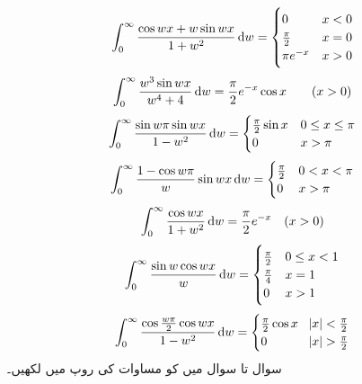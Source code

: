 \begin{align*}
\int_0^{\infty} \frac{\cos wx+w\sin wx}{1+w^2}\dif w=
\begin{cases}
0&x<0\\
\frac{\pi}{2}&x=0\\
\pi e^{-x} &x>0
\end{cases}
\end{align*}
\begin{align*}
\int_0^{\infty} \frac{w^3\sin wx}{w^4+4}\dif w=\frac{\pi}{2}e^{-x}\cos x\quad \quad (x>0)
\end{align*}
\begin{align*}
\int_0^{\infty} \frac{\sin w\pi\sin wx}{1-w^2}\dif w=
\begin{cases}
\frac{\pi}{2}\sin x&0\le x\le \pi\\
0&x>\pi
\end{cases}
\end{align*}
\begin{align*}
\int_0^{\infty} \frac{1-\cos w\pi}{w}\sin wx\dif w=
\begin{cases}
\frac{\pi}{2}&0< x< \pi\\
0&x>\pi
\end{cases}
\end{align*}
\begin{align*}
\int_0^{\infty} \frac{\cos wx}{1+w^2}\dif w=\frac{\pi}{2}e^{-x}\quad (x>0)
\end{align*}
\begin{align*}
\int_0^{\infty} \frac{\sin w\cos wx}{w}\dif w=
\begin{cases}
\frac{\pi}{2}&0\le  x< 1\\
\frac{\pi}{4}&x=1\\
0&x>1
\end{cases}
\end{align*}
\begin{align*}
\int_0^{\infty} \frac{\cos\frac{w\pi}{2}\cos wx}{1-w^2}\dif w=
\begin{cases}
\frac{\pi}{2}\cos x&\abs{x}<\frac{\pi}{2}\\
0&\abs{x}>\frac{\pi}{2}
\end{cases}
\end{align*}
سوال  تا سوال  میں  کو مساوات  کی روپ میں لکھیں۔

